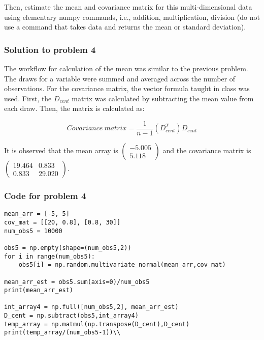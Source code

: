 \documentclass[12pt]{article}%
\begin{document}
Then, estimate the mean and covariance matrix for this multi-dimensional data using elementary numpy commands, i.e., addition, multiplication, division (do not use a command that takes data and returns the mean or standard deviation).\\

\subsubsection{Solution to problem 4}

The workflow for calculation of the mean was similar to the previous problem. The draws for a variable were summed and averaged across the number of observations. For the covariance matrix, the vector formula taught in class was used. First, the $D_{cent}$ matrix was calculated by subtracting the mean value from each draw. Then, the matrix is calculated as:

\begin{equation}
    Covariance\ matrix = \frac{1}{n-1}(D_{cent}^T)D_{cent}
\end{equation}

\noindent It is observed that the mean array is $\begin{pmatrix}-5.005\\5.118\end{pmatrix}$ and the covariance matrix is $\begin{pmatrix}19.464 & 0.833\\0.833 & 29.020\end{pmatrix}$.


\subsubsection{Code for problem 4}
\begin{lstlisting}
mean_arr = [-5, 5]
cov_mat = [[20, 0.8], [0.8, 30]]
num_obs5 = 10000

obs5 = np.empty(shape=(num_obs5,2))
for i in range(num_obs5):
    obs5[i] = np.random.multivariate_normal(mean_arr,cov_mat)

mean_arr_est = obs5.sum(axis=0)/num_obs5
print(mean_arr_est)

int_array4 = np.full([num_obs5,2], mean_arr_est)
D_cent = np.subtract(obs5,int_array4)
temp_array = np.matmul(np.transpose(D_cent),D_cent)
print(temp_array/(num_obs5-1))\\
\end{lstlisting}

\end{document}
